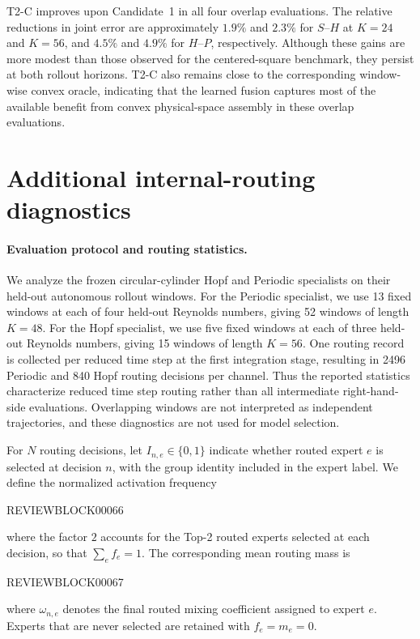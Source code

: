 \documentclass{article}
\begin{document}
T2-C improves upon Candidate~1 in all four overlap evaluations.
The relative reductions in joint error are approximately $1.9\%$ and
$2.3\%$ for $S$--$H$ at $K=24$ and $K=56$, and $4.5\%$ and $4.9\%$
for $H$--$P$, respectively. Although these gains are more modest than those observed for the centered-square benchmark, they persist at both rollout horizons. T2-C also remains close to the corresponding window-wise convex oracle, indicating that the learned fusion captures most of the available benefit from convex physical-space assembly in these overlap evaluations.

\FloatBarrier
\section{Additional internal-routing diagnostics}
\label{app:internal_routing}

\paragraph{Evaluation protocol and routing statistics.}
We analyze the frozen circular-cylinder Hopf and Periodic specialists on their held-out autonomous rollout windows.
For the Periodic specialist, we use 13 fixed windows at each of four held-out Reynolds numbers, giving 52 windows of length $K=48$. For the Hopf specialist, we use five fixed windows at each of three held-out Reynolds numbers, giving 15 windows of length $K=56$. One routing record is collected per reduced time step at the first integration stage, resulting in 2496 Periodic and 840 Hopf routing decisions per channel. Thus the reported statistics characterize reduced time step routing rather than all intermediate right-hand-side evaluations. Overlapping windows are not interpreted as independent trajectories, and these diagnostics are not used for model selection.

For $N$ routing decisions, let $I_{n,e}\in\{0,1\}$ indicate whether routed expert $e$ is selected at decision $n$, with the group identity included in the expert label. We define the normalized activation frequency


REVIEWBLOCK00066


where the factor $2$ accounts for the Top-2 routed experts selected at each decision, so that $\sum_e f_e=1$. The corresponding mean routing mass is


REVIEWBLOCK00067


where $\omega_{n,e}$ denotes the final routed mixing coefficient assigned to expert $e$. Experts that are never selected are retained with $f_e=m_e=0$.
\end{document}
